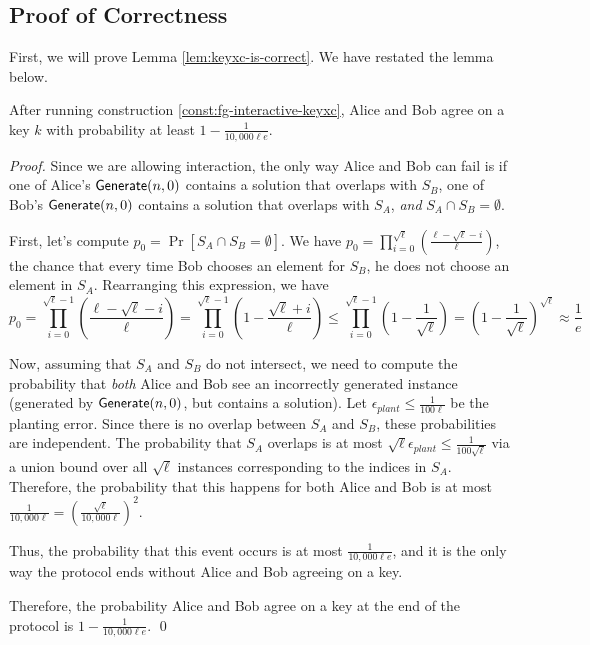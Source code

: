
\subsection{Proof of Correctness}\label{sec:proof-of-correctness}
First, we will prove Lemma \ref{lem:keyxc-is-correct}. We have restated the lemma below.
\begin{lemma}
	After running construction \ref{const:fg-interactive-keyxc}, Alice and Bob agree on a key $k$ with probability at least $1 - \frac{1}{10,000 \ell e}$.
\end{lemma}
\begin{proof}
	Since we are allowing interaction, the only way Alice and Bob can fail is if one of Alice's $\mathsf{Generate}(n,0)$ contains a solution that overlaps with $S_B$, one of Bob's $\mathsf{Generate}(n,0)$ contains a solution that overlaps with $S_A$, \emph{and} $S_A \cap S_B = \emptyset$.
	
	First, let's compute $p_0 = \Pr[S_A \cap S_B = \emptyset]$. We have $p_0 = \prod_{i = 0}^{\sqrt \ell} \left(\frac{\ell - \sqrt \ell - i}{\ell} \right)$, the chance that every time Bob chooses an element for $S_B$, he does not choose an element in $S_A$. Rearranging this expression, we have
	\[ p_0 = \prod_{i = 0}^{\sqrt \ell-1} \left(\frac{\ell - \sqrt \ell - i}{\ell} \right) = \prod_{i=0}^{\sqrt \ell-1} (1 - \frac{\sqrt{\ell} + i}{\ell})
	\le \prod_{i=0}^{\sqrt{\ell} - 1} \left( 1 - \frac{1}{\sqrt{\ell}} \right)
	= \left( 1 - \frac{1}{\sqrt{\ell}} \right)^{\sqrt{\ell}} \approx \frac{1}{e}
	\]
	
	Now, assuming that $S_A$ and $S_B$ do not intersect, we need to compute the probability that \emph{both} Alice and Bob see an incorrectly generated instance (generated by $\mathsf{Generate}(n,0)$, but contains a solution). Let $\epsilon_{plant} \le \frac{1}{100 \ell}$ be the planting error. Since there is no overlap between $S_A$ and $S_B$, these probabilities are independent. The probability that $S_A$ overlaps is at most $ \sqrt \ell \epsilon_{plant} \le \frac{1}{100 \sqrt \ell}$ via a union bound over all $\sqrt \ell$ instances corresponding to the indices in $S_A$. Therefore, the probability that this happens for both Alice and Bob is at most $ \frac{1}{10,000\ell} = \left(\frac{\sqrt \ell }{10,000\ell}\right)^2$.
	
	Thus, the probability that this event occurs is at most $\frac{1}{10,000 \ell e}$, and it is the only way the protocol ends without Alice and Bob agreeing on a key.
	
	Therefore, the probability Alice and Bob agree on a key at the end of the protocol is $1 - \frac{1}{10,000 \ell e}$. \qed
\end{proof}

